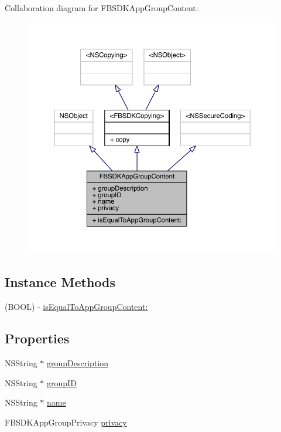 Collaboration diagram for F\-B\-S\-D\-K\-App\-Group\-Content\-:
\nopagebreak
\begin{figure}[H]
\begin{center}
\leavevmode
\includegraphics[width=350pt]{interface_f_b_s_d_k_app_group_content__coll__graph}
\end{center}
\end{figure}
\subsection*{Instance Methods}
\begin{DoxyCompactItemize}
\item 
(B\-O\-O\-L) -\/ \hyperlink{interface_f_b_s_d_k_app_group_content_a8b4c037d47575121d93be1dbb2643e09}{is\-Equal\-To\-App\-Group\-Content\-:}
\end{DoxyCompactItemize}
\subsection*{Properties}
\begin{DoxyCompactItemize}
\item 
N\-S\-String $\ast$ \hyperlink{interface_f_b_s_d_k_app_group_content_abb46868ac35b14093f032f25c53b8106}{group\-Description}
\item 
N\-S\-String $\ast$ \hyperlink{interface_f_b_s_d_k_app_group_content_a4caee641712b602afbffb931da99a003}{group\-I\-D}
\item 
N\-S\-String $\ast$ \hyperlink{interface_f_b_s_d_k_app_group_content_a838919b863c4398e13315ec1bae8dd98}{name}
\item 
F\-B\-S\-D\-K\-App\-Group\-Privacy \hyperlink{interface_f_b_s_d_k_app_group_content_a8d405bc64a6c40dfbc5165dc524c37a7}{privacy}
\end{DoxyCompactItemize}


